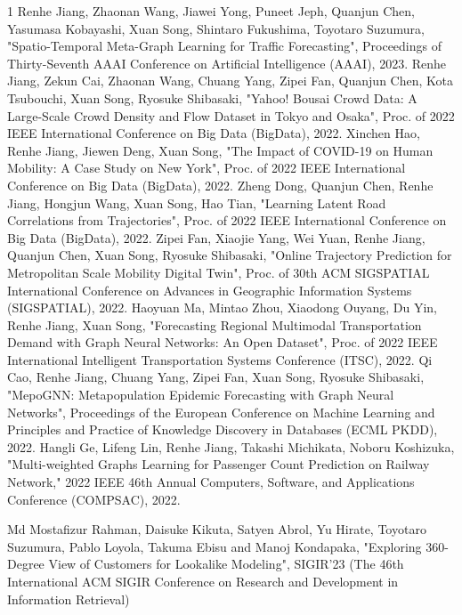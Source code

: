 \begin{査読付}{1}
Renhe Jiang, Zhaonan Wang, Jiawei Yong, Puneet Jeph, Quanjun Chen, Yasumasa Kobayashi,
Xuan Song, Shintaro Fukushima, Toyotaro Suzumura, "Spatio-Temporal Meta-Graph Learning for Traffic Forecasting", Proceedings of Thirty-Seventh AAAI Conference on Artificial Intelligence (AAAI), 2023.
Renhe Jiang, Zekun Cai, Zhaonan Wang, Chuang Yang, Zipei Fan, Quanjun Chen, Kota Tsubouchi, Xuan Song, Ryosuke Shibasaki, "Yahoo! Bousai Crowd Data: A Large-Scale Crowd Density and Flow Dataset in Tokyo and Osaka", Proc. of 2022 IEEE International Conference on Big Data (BigData), 2022.
Xinchen Hao, Renhe Jiang, Jiewen Deng, Xuan Song, "The Impact of COVID-19 on Human Mobility: A Case Study on New York", Proc. of 2022 IEEE International Conference on Big Data (BigData), 2022.
Zheng Dong, Quanjun Chen, Renhe Jiang, Hongjun Wang, Xuan Song, Hao Tian, "Learning Latent Road Correlations from Trajectories", Proc. of 2022 IEEE International Conference on Big Data (BigData), 2022.
Zipei Fan, Xiaojie Yang, Wei Yuan, Renhe Jiang, Quanjun Chen, Xuan Song, Ryosuke Shibasaki, "Online Trajectory Prediction for Metropolitan Scale Mobility Digital Twin", Proc. of 30th ACM SIGSPATIAL International Conference on Advances in Geographic Information Systems (SIGSPATIAL), 2022. 
Haoyuan Ma, Mintao Zhou, Xiaodong Ouyang, Du Yin, Renhe Jiang, Xuan Song, "Forecasting Regional Multimodal Transportation Demand with Graph Neural Networks: An Open Dataset", Proc. of 2022 IEEE International Intelligent Transportation Systems Conference (ITSC), 2022.
Qi Cao, Renhe Jiang, Chuang Yang, Zipei Fan, Xuan Song, Ryosuke Shibasaki, "MepoGNN: Metapopulation Epidemic Forecasting with Graph Neural Networks", Proceedings of the European Conference on Machine Learning and Principles and Practice of Knowledge Discovery in Databases (ECML PKDD), 2022. 
Hangli Ge, Lifeng Lin, Renhe Jiang, Takashi Michikata, Noboru Koshizuka, "Multi-weighted Graphs Learning for Passenger Count Prediction on Railway Network," 2022 IEEE 46th Annual Computers, Software, and Applications Conference (COMPSAC), 2022.


Md Mostafizur Rahman, Daisuke Kikuta, Satyen Abrol, Yu Hirate, Toyotaro Suzumura, Pablo Loyola, Takuma Ebisu and Manoj Kondapaka, "Exploring 360-Degree View of Customers for Lookalike Modeling",  SIGIR'23 (The 46th International ACM
SIGIR Conference on Research and Development in Information
Retrieval) 



\end{査読付}
